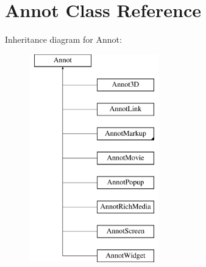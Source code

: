 \hypertarget{class_annot}{}\section{Annot Class Reference}
\label{class_annot}
Inheritance diagram for Annot\+:\begin{figure}[H]
\begin{center}
\leavevmode
\includegraphics[height=9.000000cm]{class_annot}
\end{center}
\end{figure}
